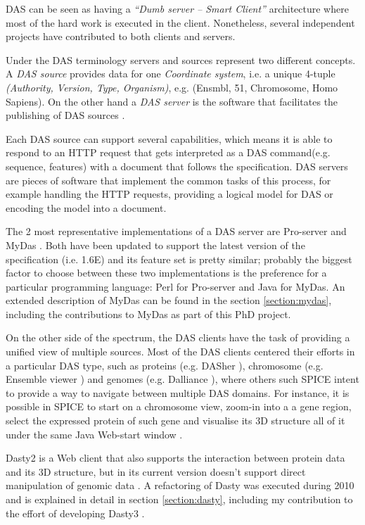 DAS can be seen as having a \emph{``Dumb server -- Smart Client''} architecture where most of the hard work is executed in the client. Nonetheless, several independent projects have contributed to both clients and servers. 

Under the DAS terminology servers and sources represent two different concepts. A \emph{DAS source} provides data for one \emph{Coordinate system}, i.e. a unique 4-tuple \emph{(Authority, Version, Type, Organism)}, e.g. (Ensmbl, 51, Chromosome, Homo Sapiens). On the other hand a \emph{DAS server} is the software that facilitates the publishing of DAS sources \cite{DASCS2009}.

Each DAS source can support several capabilities, which means it is able to respond to an HTTP request that gets interpreted as a DAS command(e.g. sequence, features) with a document that follows the specification. DAS servers are pieces of software that implement the common tasks of this process, for example handling the HTTP requests, providing a logical model for DAS or encoding the model into a document.

The 2 most representative implementations of a DAS server are Pro-server \cite{FIN2007} and MyDas \cite{SAL2012}. Both have been updated to support the latest version of the specification (i.e. 1.6E) and its feature set is pretty similar; probably the biggest factor to choose between these two implementations is the preference for a particular programming language: Perl for Pro-server and Java for MyDas. An extended description of MyDas can be found in the section \ref{section:mydas}, including the contributions to MyDas as part of this PhD project.

On the other side of the spectrum, the DAS clients have the task of providing a unified view of multiple sources. Most of the DAS clients centered their efforts in a particular DAS type, such as proteins (e.g. DASher \cite{MES2009}), chromosome (e.g. Ensemble viewer \cite{FLI2011}) and genomes (e.g. Dalliance \cite{DOW2011}), where others such SPICE intent to provide a way to navigate between multiple DAS domains. For instance, it is possible in SPICE to start on a chromosome view, zoom-in into a a gene region, select the expressed protein of such gene and visualise its 3D structure all of it under the same Java Web-start window \cite{PRL2005}.

Dasty2 is a Web client that also supports the interaction between protein data and its 3D structure, but in its current version doesn't support direct manipulation of genomic data \cite{JIM2008}. A refactoring of Dasty was executed during 2010 and is explained in detail in section \ref{section:dasty}, including my contribution to the effort of developing Dasty3 \cite{VIL2011}. 

